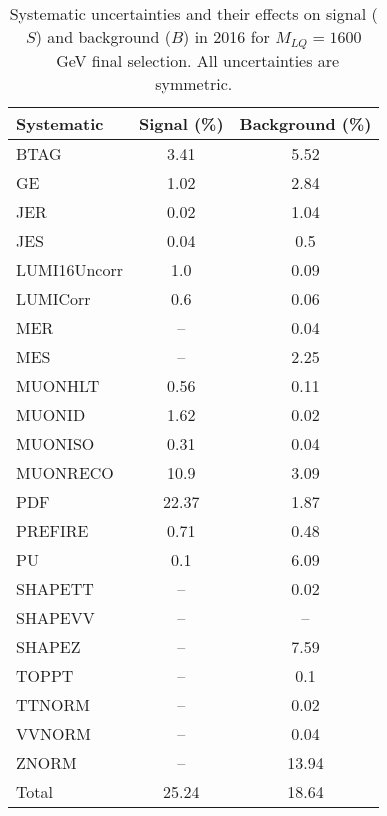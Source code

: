 \begin{table}[htbp]
\begin{center}
\caption{Systematic uncertainties and their effects on signal ($S$) and background ($B$) in 2016 for $M_{LQ}=1600$~GeV final selection. All uncertainties are symmetric.}
\begin{tabular}{lcc}
\hline\hline
Systematic & Signal (\%) & Background (\%) \\ \hline 
BTAG & 3.41 & 5.52\\ 
GE & 1.02 & 2.84\\ 
JER & 0.02 & 1.04\\ 
JES & 0.04 & 0.5\\ 
LUMI16Uncorr & 1.0 & 0.09\\ 
LUMICorr & 0.6 & 0.06\\ 
MER & -- & 0.04\\ 
MES & -- & 2.25\\ 
MUONHLT & 0.56 & 0.11\\ 
MUONID & 1.62 & 0.02\\ 
MUONISO & 0.31 & 0.04\\ 
MUONRECO & 10.9 & 3.09\\ 
PDF & 22.37 & 1.87\\ 
PREFIRE & 0.71 & 0.48\\ 
PU & 0.1 & 6.09\\ 
SHAPETT & -- & 0.02\\ 
SHAPEVV & -- & --\\ 
SHAPEZ & -- & 7.59\\ 
TOPPT & -- & 0.1\\ 
TTNORM & -- & 0.02\\ 
VVNORM & -- & 0.04\\ 
ZNORM & -- & 13.94\\ 
Total & 25.24 & 18.64\\ \hline \hline
\end{tabular}
\label{tab:SysUncertainties_uujj_1600}
\end{center}
\end{table}

